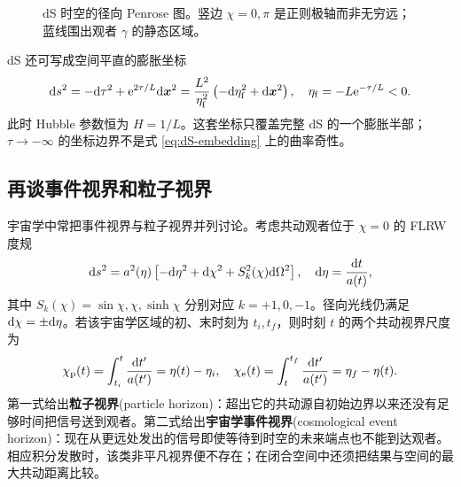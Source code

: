\begin{figure}[htbp]
    \centering
    \caption{dS 时空的径向 Penrose 图。竖边 $\chi=0,\pi$ 是正则极轴而非无穷远；蓝线围出观者 $\gamma$ 的静态区域。}
    \label{fig:dS-penrose}
\end{figure}

dS 还可写成空间平直的膨胀坐标
\begin{equation}\label{eq:dS-flat-slicing}
    \dd s^2=-\dd\tau^2+\mathrm{e}^{2\tau/L}\dd\bm x^2
      =\frac{L^2}{\eta_{\rm f}^2}
       \left(-\dd\eta_{\rm f}^2+\dd\bm x^2\right),
    \quad \eta_{\rm f}=-L\mathrm{e}^{-\tau/L}<0.
\end{equation}
此时 Hubble 参数恒为 $H=1/L$。这套坐标只覆盖完整 dS 的一个膨胀半部；$\tau\to-\infty$ 的坐标边界不是式 \eqref{eq:dS-embedding} 上的曲率奇性。

\subsection{再谈事件视界和粒子视界}

宇宙学中常把事件视界与粒子视界并列讨论。考虑共动观者位于 $\chi=0$ 的 FLRW 度规
\begin{equation}
    \dd s^2=a^2(\eta)
      \left[-\dd\eta^2+\dd\chi^2+S_k^2(\chi)\dd\Omega^2\right],
    \quad \dd\eta=\frac{\dd t}{a(t)},
\end{equation}
其中 $S_k(\chi)=\sin\chi,\chi,\sinh\chi$ 分别对应 $k=+1,0,-1$。径向光线仍满足 $\dd\chi=\pm\dd\eta$。若该宇宙学区域的初、末时刻为 $t_i,t_f$，则时刻 $t$ 的两个共动视界尺度为
\begin{equation}
    \chi_{\rm p}(t)=\int_{t_i}^{t}\frac{\dd t'}{a(t')}
      =\eta(t)-\eta_i,
    \quad
    \chi_{\rm e}(t)=\int_t^{t_f}\frac{\dd t'}{a(t')}
      =\eta_f-\eta(t).
\end{equation}
第一式给出\textbf{粒子视界}(particle horizon)：超出它的共动源自初始边界以来还没有足够时间把信号送到观者。第二式给出\textbf{宇宙学事件视界}(cosmological event horizon)：现在从更远处发出的信号即使等待到时空的未来端点也不能到达观者。相应积分发散时，该类非平凡视界便不存在；在闭合空间中还须把结果与空间的最大共动距离比较。

